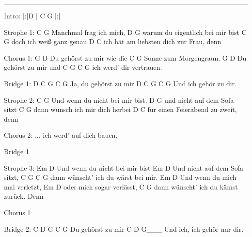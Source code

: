 \noindent\rule{\columnwidth}{1pt}

\begin{multicols}{2}
\begin{lstsong}
Intro: |:|D  | C G |:|

Strophe 1:
C                 G
Manchmal frag ich mich,
  D                         G
warum du eigentlich bei mir bist
     C               G
doch ich weiß ganz genau
           D                 C
ich hät am liebsten dich zur Frau, denn

Chorus 1:
G             D
Du gehörst zu mir  wie die
C               G
Sonne zum Morgengraun.
G             D
Du gehörst zu mir  und
C                G      C G
ich werd' dir vertrauen.

Bridge 1:
    D     C       G   C  G
Ja, du gehörst zu mir
    D     C       G   C  G
Und ich gehör zu dir.








Strophe 2:
    C                     G
Und wenn du nicht bei mir bist,
          D             G
und nicht auf dem Sofa sitzt
     C                      G
dann wünsch ich mir dich herbei
          D             C
für einen Feierabend zu zweit, denn

Chorus 2: ... ich werd' auf dich bauen.

Bridge 1

Strophe 3:
     Em                   D
Und wenn du nicht bei mir bist
          Em            D
Und nicht auf dem Sofa sitzt,
      C                        G    C G
dann wünscht' ich du wärst bei mir.
     Em                 D
Und wenn du mich mal verletzt,
     Em            D
oder mich sogar verlässt,
     C                       G
dann wünscht' ich du kämst zurück. Denn

Chorus 1

Bridge 2:
C     D       G   C G
Du gehörst zu mir
    C        D         G___
Und ich, ich gehör nur dir.
\end{lstsong}
\end{multicols}
\newpage

\begin{comment}
Alternativer Chorus:
Du gehörst zu mir, wie die Sonne zum Morgengraun.
Du gehörst zu mir, wie keine andre Braut.

Alternative Strophe:
Manchmal frag ich mich,
ob du wirklich bist.
Denn ich fühle mich
Als ob du ein Traum bist.

Alternative Coda:
Du bist wunderschön für mich,
bitte bleibt so wie du bist.
\end{comment}


